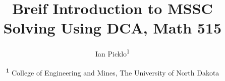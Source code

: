\documentclass[twocolumn]{NobArticle}
\title{Breif Introduction to MSSC Solving Using DCA, Math 515}
\author{
    Ian Picklo\textsuperscript{1}}
\date{
    \textsuperscript{\textbf{1}}
    College of Engineering and Mines, The University of North Dakota \\
}
\begin{document}
\small
\maketitle










\end{document}
